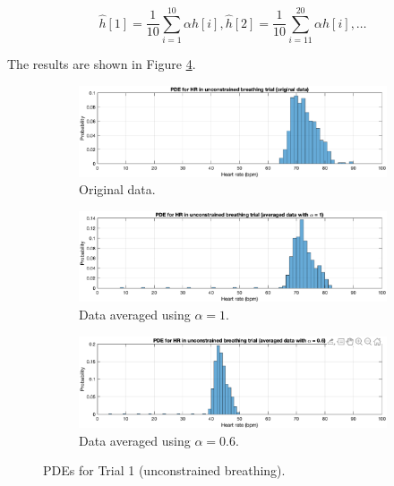 \begin{equation}
\widehat{h}[1]=\frac{1}{10} \sum_{i=1}^{10} \alpha h[i], \widehat{h}[2]=\frac{1}{10} \sum_{i=11}^{20} \alpha h[i], \ldots
\label{eqn:pde}
\end{equation}

\noindent
The results are shown in Figure \ref{fig:pdes}.

\begin{figure}[H]
    \begin{center}
\begin{subfigure}{0.6\textwidth}
  \includegraphics[width=\linewidth]{assignment2figs/pde_uncon.eps}
  \caption{Original data.}
  \label{fig:pde1}
\end{subfigure}\hfil 
\medskip
\begin{subfigure}{0.6\textwidth}
  \includegraphics[width=\linewidth]{assignment2figs/pde_uncon1.eps}
  \caption{Data averaged using $\alpha = 1$.}
  \label{fig:pde2}
\end{subfigure}\hfil 
\medskip
\begin{subfigure}{0.6\textwidth}
  \includegraphics[width=\linewidth]{assignment2figs/pde_uncon06.eps}
  \caption{Data averaged using $\alpha = 0.6$.}
  \label{fig:pde3}
\end{subfigure}
\caption{PDEs for Trial 1 (unconstrained breathing).}
\label{fig:pdes}
\end{center}
\end{figure}

